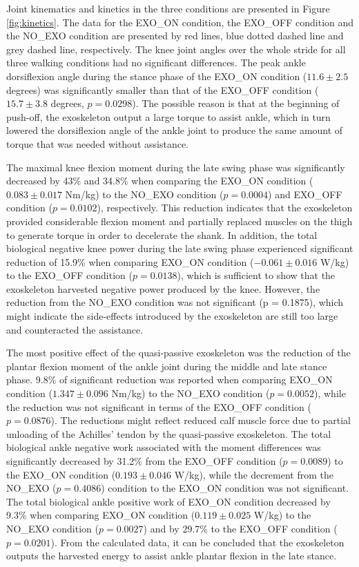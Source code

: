 \documentclass[twocolumn,cleanfoot,10pt]{asme2ej}
\begin{document}
Joint kinematics and kinetics in the three conditions are presented in Figure \ref{fig:kinetics}.
The data for the EXO\_ON condition, the EXO\_OFF condition and the NO\_EXO condition are presented by red lines, blue dotted dashed line and grey dashed line, respectively.
The knee joint angles over the whole stride for all three walking conditions had no significant differences.
The peak ankle dorsiflexion angle during the stance phase of the EXO\_ON condition ($11.6\pm2.5$ degrees) was significantly smaller than that of the EXO\_OFF condition ($15.7\pm3.8$ degrees, $p=0.0298$).
The possible reason is that at the beginning of push-off, the exoskeleton output a large torque to assist ankle, which in turn lowered the dorsiflexion angle of the ankle joint to produce the same amount of torque that was needed without assistance. 

The maximal knee flexion moment during the late swing phase was significantly decreased by 43\% and 34.8\% when comparing the EXO\_ON condition ($0.083\pm0.017$ Nm/kg) to the NO\_EXO condition ($p = 0.0004$) and EXO\_OFF condition ($p = 0.0102$), respectively.
This reduction indicates that the exoskeleton provided considerable flexion moment and partially replaced muscles on the thigh to generate torque in order to decelerate the shank.
In addition, the total biological negative knee power during the late swing phase experienced significant reduction of 15.9\% when comparing EXO\_ON condition ($-0.061\pm0.016$ W/kg) to the EXO\_OFF condition ($p = 0.0138$), which is sufficient to show that the exoskeleton harvested negative power produced by the knee.
However, the reduction from the NO\_EXO condition was not significant (p = 0.1875), which might indicate the side-effects introduced by the exoskeleton are still too large and counteracted the assistance.

The most positive effect of the quasi-passive exoskeleton was the reduction of the plantar flexion moment of the ankle joint during the middle and late stance phase.
9.8\% of significant reduction was reported when comparing EXO\_ON condition ($1.347\pm0.096$ Nm/kg) to the NO\_EXO condition ($p = 0.0052$), while the reduction was not significant in terms of the EXO\_OFF condition ($p = 0.0876$).
The reductions might reflect reduced calf muscle force due to partial unloading of the Achilles’ tendon by the quasi-passive exoskeleton.
The total biological ankle negative work associated with the moment differences was significantly decreased by 31.2\% from the EXO\_OFF condition ($p = 0.0089$) to the EXO\_ON condition ($0.193\pm0.046$ W/kg), while the decrement from the NO\_EXO ($p = 0.4086$) condition to the EXO\_ON condition was not significant.
The total biological ankle positive work of EXO\_ON condition decreased by 9.3\% when comparing EXO\_ON condition ($0.119\pm0.025$ W/kg) to the NO\_EXO condition ($p = 0.0027$) and by 29.7\% to the EXO\_OFF condition ($p = 0.0201$).
From the calculated data, it can be concluded that the exoskeleton outputs the harvested energy to assist ankle plantar flexion in the late stance. 
\end{document}
